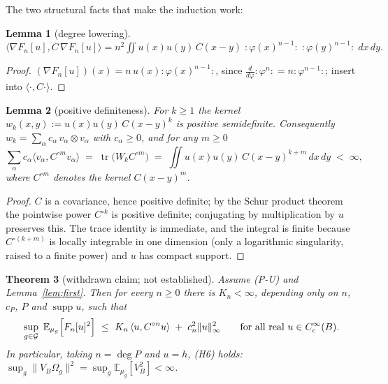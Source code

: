 \documentclass[11pt,a4paper]{article}
\theoremstyle{plain}
\newtheorem{theorem}{Theorem}[section]
\newtheorem{lemma}[theorem]{Lemma}
\theoremstyle{definition}
\newcommand{\Om}{\Omega}
\newcommand{\E}{\mathbb{E}}
\newcommand{\ip}[2]{\langle #1,#2\rangle}
\DeclareMathOperator{\tr}{tr}
\DeclareMathOperator{\supp}{supp}
\begin{document}
The two structural facts that make the induction work:

\begin{lemma}[degree lowering]\label{lem:grad}
$\ip{\nabla F_n[u]}{C\,\nabla F_n[u]}
 =n^2\!\iint u(x)u(y)\,C(x-y)\;{:}\varphi(x)^{n-1}{:}\;{:}\varphi(y)^{n-1}{:}\;dx\,dy .$
\end{lemma}

\begin{proof}
$(\nabla F_n[u])(x)=n\,u(x){:}\varphi(x)^{n-1}{:}$, since $\tfrac{d}{d\varphi}{:}\varphi^n{:}
=n{:}\varphi^{n-1}{:}$; insert into $\ip{\cdot}{C\cdot}$.
\end{proof}

\begin{lemma}[positive definiteness]\label{lem:PD}
For $k\ge1$ the kernel $w_k(x,y):=u(x)u(y)\,C(x-y)^k$ is positive semidefinite. Consequently
$w_k=\sum_\alpha c_\alpha\,v_\alpha\otimes v_\alpha$ with $c_\alpha\ge0$, and for any $m\ge0$
\[
  \sum_\alpha c_\alpha\ip{v_\alpha}{C^{\circ m}v_\alpha}
  \;=\;\tr\bigl(W_kC^{\circ m}\bigr)\;=\;\iint u(x)u(y)\,C(x-y)^{k+m}\,dx\,dy\;<\;\infty ,
\]
where $C^{\circ m}$ denotes the kernel $C(x-y)^m$.
\end{lemma}

\begin{proof}
$C$ is a covariance, hence positive definite; by the Schur product theorem the pointwise power
$C^{\circ k}$ is positive definite; conjugating by multiplication by $u$ preserves this. The trace
identity is immediate, and the integral is finite because $C^{\circ(k+m)}$ is locally integrable in
one dimension (only a logarithmic singularity, raised to a finite power) and $u$ has compact
support.
\end{proof}

\begin{theorem}[withdrawn claim; not established]\label{thm:main}
Assume \textup{(P-U)} and Lemma~\ref{lem:first}. Then for every $n\ge0$ there is $K_n<\infty$,
depending only on $n$, $c_P$, $P$ and $\supp u$, such that
\begin{equation}\label{eq:IH}
  \sup_{g\in\mathcal G}\ \E_{\mu_g}\Bigl[F_n[u]^2\Bigr]\ \le\ K_n\,\ip{u}{C^{\circ n}u}
  \;+\;c_n^2\|u\|_\infty^2 \qquad\text{for all real }u\in C_c^\infty(B).
\end{equation}
In particular, taking $n=\deg P$ and $u=h$, \textup{(H6)} holds:
$\sup_g\|V_B\Om_g\|^2=\sup_g\E_{\mu_g}[V_B^2]<\infty$.
\end{theorem}
\end{document}
